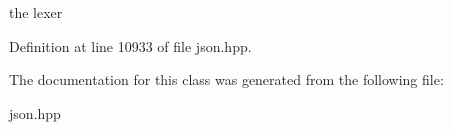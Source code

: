 the lexer 



Definition at line 10933 of file json.\+hpp.



The documentation for this class was generated from the following file\+:\begin{DoxyCompactItemize}
\item 
json.\+hpp\end{DoxyCompactItemize}

